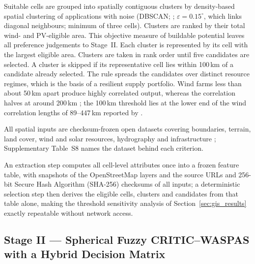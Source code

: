 \documentclass[preprint,12pt,authoryear]{elsarticle}
\begin{document}
Suitable cells are grouped into spatially contiguous clusters by density-based spatial clustering of applications with noise (DBSCAN; \citealp{ester1996density}; $\varepsilon = 0.15^\circ$, which links diagonal neighbours; minimum of three cells). Clusters are ranked by their total wind- and PV-eligible area. This objective measure of buildable potential leaves all preference judgements to Stage~II. Each cluster is represented by its cell with the largest eligible area. Clusters are taken in rank order until five candidates are selected. A cluster is skipped if its representative cell lies within 100\,km of a candidate already selected. The rule spreads the candidates over distinct resource regimes, which is the basis of a resilient supply portfolio. Wind farms less than about 50\,km apart produce highly correlated output, whereas the correlation halves at around 200\,km \citep{katzenstein2010variability}; the 100\,km threshold lies at the lower end of the wind correlation lengths of 89--447\,km reported by \citet{stmartin2015variability}.

All spatial inputs are checksum-frozen open datasets covering boundaries, terrain, land cover, wind and solar resources, hydrography and infrastructure \citep{runfola2020geoboundaries,copernicusdem,zanaga2022worldcover,davis2023global,huld2012pvgis,pfeifroth2024sarah3,lehner2013hydrorivers,naturalearth,osm2026}; Supplementary Table~S8 names the dataset behind each criterion.

An extraction step computes all cell-level attributes once into a frozen feature table, with snapshots of the OpenStreetMap layers and the source URLs and 256-bit Secure Hash Algorithm (SHA-256) checksums of all inputs; a deterministic selection step then derives the eligible cells, clusters and candidates from that table alone, making the threshold sensitivity analysis of Section~\ref{sec:gis_results} exactly repeatable without network access.

\subsection{Stage II --- Spherical Fuzzy CRITIC--WASPAS with a Hybrid Decision Matrix}
\label{sec:stage2_method}
\end{document}

